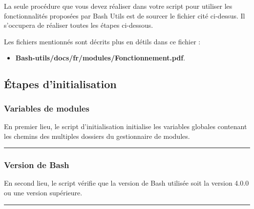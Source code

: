 \documentclass[a4paper,10pt]{article}
\begin{document}
\begin{justify}
    La seule procédure que vous devez réaliser dans votre script pour utiliser les fonctionnalités proposées par Bash Utils est de sourcer le fichier cité ci-dessus. Il s'occupera de réaliser toutes les étapes ci-dessous.
\end{justify}

\begin{justify}
    Les fichiers mentionnés sont décrits plus en détils dans ce fichier :

    \begin{itemize}
        \item \textbf{\color{lime}Bash-utils/docs/fr/modules/Fonctionnement.pdf}.
    \end{itemize}
\end{justify}


\color{green}
\subsection{Étapes d'initialisation}\color{white}

\color{blue}
\subsubsection{Variables de modules}\color{white}

\begin{justify}
    En premier lieu, le script d'initialisation initialise les variables globales contenant les chemins des multiples dossiers du gestionnaire de modules.
\end{justify}



\color{blue}\par\noindent\rule{\textwidth}{0.4pt}\color{white}

\color{blue}
\subsubsection{Version de Bash}\color{white}

\begin{justify}
    En second lieu, le script vérifie que la version de Bash utilisée soit la version 4.0.0 ou une version supérieure.
\end{justify}




\color{blue}\par\noindent\rule{\textwidth}{0.4pt}\color{white}
\end{document}
